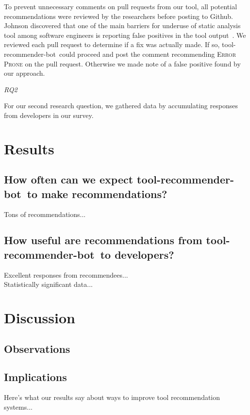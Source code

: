 \documentclass[conference]{IEEEtran}
\newcommand{\tool}{tool-recommender-bot}
\newcommand{\pseudosubsection}[1]{\vspace{2mm} {\it #1}}
\begin{document}
To prevent unnecessary comments on pull requests from our tool, all potential recommendations were reviewed by the researchers before posting to Github. Johnson discovered that one of the main barriers for underuse of static analysis tool among software engineers is reporting false positives in the tool output~\cite{Johnson2013Why}. We reviewed each pull request to determine if a fix was actually made. If so, \tool~could proceed and post the comment recommending \textsc{Error Prone} on the pull request. Otherwise we made note of a false positive found by our approach.

\pseudosubsection{RQ2}

For our second research question, we gathered data by accumulating responses from developers in our survey.

\section{Results}

\subsection{How often can we expect \tool~to make recommendations?}

Tons of recommendations... \\

\subsection{How useful are recommendations from \tool~to developers?}

Excellent responses from recommendees...\\

Statistically significant data...

\section{Discussion}

\subsection{Observations}

\subsection{Implications}

Here's what our results say about ways to improve tool recommendation systems...
\end{document}
